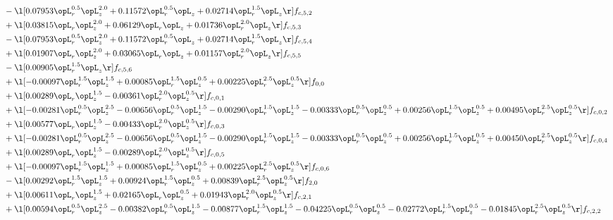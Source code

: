 \begin{alignat}{2}
& - \l[  0.07953 \opL_r^{0.5} \opL_z^{2.0} +  0.11572 \opL_r^{0.5} \opL_z +  0.02714 \opL_r^{1.5} \opL_z  \r] f_{c,5,2} \nonumber \\ 
& + \l[  0.03815 \opL_r \opL_z^{2.0} +  0.06129 \opL_r \opL_z +  0.01736 \opL_r^{2.0} \opL_z  \r] f_{c,5,3} \nonumber \\ 
& - \l[  0.07953 \opL_r^{0.5} \opL_z^{2.0} +  0.11572 \opL_r^{0.5} \opL_z +  0.02714 \opL_r^{1.5} \opL_z  \r] f_{c,5,4} \nonumber \\ 
& + \l[  0.01907 \opL_r \opL_z^{2.0} +  0.03065 \opL_r \opL_z +  0.01157 \opL_r^{2.0} \opL_z  \r] f_{c,5,5} \nonumber \\ 
& - \l[  0.00905 \opL_r^{1.5} \opL_z  \r] f_{c,5,6} \nonumber \\ 
& + \l[  -0.00097 \opL_r^{1.5} \opL_z^{1.5} +  0.00085 \opL_r^{1.5} \opL_z^{0.5} +  0.00225 \opL_r^{2.5} \opL_z^{0.5}  \r] f_{0,0} \nonumber \\ 
& + \l[  0.00289 \opL_r \opL_z^{1.5}   -0.00361 \opL_r^{2.0} \opL_z^{0.5}  \r] f_{c,0,1} \nonumber \\ 
& + \l[  -0.00281 \opL_r^{0.5} \opL_z^{2.5}   -0.00656 \opL_r^{0.5} \opL_z^{1.5}   -0.00290 \opL_r^{1.5} \opL_z^{1.5}   -0.00333 \opL_r^{0.5} \opL_z^{0.5} +  0.00256 \opL_r^{1.5} \opL_z^{0.5} +  0.00495 \opL_r^{2.5} \opL_z^{0.5}  \r] f_{c,0,2} \nonumber \\ 
& + \l[  0.00577 \opL_r \opL_z^{1.5}   -0.00433 \opL_r^{2.0} \opL_z^{0.5}  \r] f_{c,0,3} \nonumber \\ 
& + \l[  -0.00281 \opL_r^{0.5} \opL_z^{2.5}   -0.00656 \opL_r^{0.5} \opL_z^{1.5}   -0.00290 \opL_r^{1.5} \opL_z^{1.5}   -0.00333 \opL_r^{0.5} \opL_z^{0.5} +  0.00256 \opL_r^{1.5} \opL_z^{0.5} +  0.00450 \opL_r^{2.5} \opL_z^{0.5}  \r] f_{c,0,4} \nonumber \\ 
& + \l[  0.00289 \opL_r \opL_z^{1.5}   -0.00289 \opL_r^{2.0} \opL_z^{0.5}  \r] f_{c,0,5} \nonumber \\ 
& + \l[  -0.00097 \opL_r^{1.5} \opL_z^{1.5} +  0.00085 \opL_r^{1.5} \opL_z^{0.5} +  0.00225 \opL_r^{2.5} \opL_z^{0.5}  \r] f_{c,0,6} \nonumber \\ 
& - \l[  0.00292 \opL_r^{1.5} \opL_z^{1.5} +  0.00924 \opL_r^{1.5} \opL_z^{0.5} +  0.00839 \opL_r^{2.5} \opL_z^{0.5}  \r] f_{2,0} \nonumber \\ 
& + \l[  0.00611 \opL_r \opL_z^{1.5} +  0.02165 \opL_r \opL_z^{0.5} +  0.01943 \opL_r^{2.0} \opL_z^{0.5}  \r] f_{c,2,1} \nonumber \\ 
& + \l[  0.00594 \opL_r^{0.5} \opL_z^{2.5}   -0.00382 \opL_r^{0.5} \opL_z^{1.5}   -0.00877 \opL_r^{1.5} \opL_z^{1.5}   -0.04225 \opL_r^{0.5} \opL_z^{0.5}   -0.02772 \opL_r^{1.5} \opL_z^{0.5}   -0.01845 \opL_r^{2.5} \opL_z^{0.5}  \r] f_{c,2,2} \nonumber \\ 

\end{alignat}
